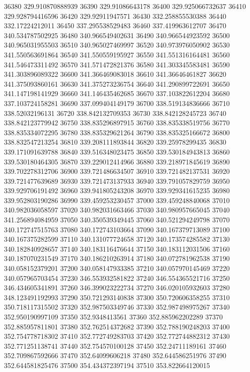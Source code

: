 {36380 329.910870888939
36390 329.91086643178
36400 329.925066732637
36410 329.928794416596
36420 329.92911947571
36430 332.258855530388
36440 332.17224212011
36450 337.295538529483
36460 337.419963612707
36470 340.534787502925
36480 340.966549402631
36490 340.966544923592
36500 340.965031955503
36510 340.965027469997
36520 340.973976050902
36530 341.550563691864
36540 341.550559195927
36550 341.551316164481
36560 341.546473311492
36570 341.571472821376
36580 341.303345583481
36590 341.303896089322
36600 341.366469083018
36610 341.36646461827
36620 341.375093860161
36630 341.375273236754
36640 341.290899722691
36650 341.147198141929
36660 341.146435462685
36670 337.103822612204
36680 337.103724158281
36690 337.099404149179
36700 338.519134836666
36710 338.52032196131
36720 338.842132709353
36730 338.842128245723
36740 338.842123779942
36750 338.835296897915
36760 338.835338519756
36770 338.835334072295
36780 338.835329621264
36790 338.835325166672
36800 338.832547213254
36810 339.208111893844
36820 339.25978299435
36830 339.171091639788
36840 339.516348023475
36850 339.530184943813
36860 339.530180464305
36870 339.229012414966
36880 339.218971845619
36890 339.702278312706
36900 339.721486634507
36910 339.721482137531
36920 339.721477639689
36930 339.721473137933
36940 339.791057829759
36950 339.929706191492
36960 339.941805243208
36970 339.929341615235
36980 339.952803190286
36990 339.459253230457
37000 339.459248840068
37010 340.982036058597
37020 340.982031663466
37030 340.980957665045
37040 341.256894084959
37050 340.350539349445
37060 340.521294249798
37070 340.172747515763
37080 340.172743103664
37090 340.167379713089
37100 340.167375282599
37110 340.131077724658
37120 340.173574285582
37130 340.182840928657
37140 340.183116476644
37150 340.183112031506
37160 340.187070231549
37170 340.186210263914
37180 340.072781962538
37190 340.058152379201
37200 340.058147933385
37210 340.057970145469
37220 340.057965703454
37230 346.553932581822
37240 346.554365521716
37250 346.434605341891
37260 346.399023222734
37270 346.020105932603
37280 348.123491192993
37290 350.721293140838
37300 350.720606358255
37310 350.718117315502
37320 352.987503349746
37330 352.987498975267
37340 352.950190997109
37350 352.9348413561
37360 352.885962202289
37370 352.885957811801
37380 352.762514372682
37390 352.788190248203
37400 352.754778718302
37410 352.772749283703
37420 352.772744882312
37430 352.771251138741
37440 352.754570100128
37450 352.24711189161
37460 352.709867592666
37470 352.64099606218
37480 352.644586251976
37490 352.644581825476
37500 354.434372397194
37510 353.822664120015
}
